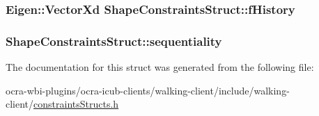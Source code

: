 \hypertarget{structShapeConstraintsStruct_a019f2dc8e024954a9413e0a5c5be9864}{
\subsubsection[{f\-History}]{\setlength{\rightskip}{0pt plus 5cm}\-Eigen\-::\-Vector\-Xd {\bf \-Shape\-Constraints\-Struct\-::f\-History}}}\label{structShapeConstraintsStruct_a019f2dc8e024954a9413e0a5c5be9864}
\hypertarget{structShapeConstraintsStruct_ab21948647937089aa8f72ddb8d1536b2}{
\subsubsection[{sequentiality}]{ {\bf \-Shape\-Constraints\-Struct\-::sequentiality}}}\label{structShapeConstraintsStruct_ab21948647937089aa8f72ddb8d1536b2}


\-The documentation for this struct was generated from the following file\-:\begin{DoxyCompactItemize}
\item 
ocra-\/wbi-\/plugins/ocra-\/icub-\/clients/walking-\/client/include/walking-\/client/\hyperlink{constraintsStructs_8h}{constraints\-Structs.\-h}\end{DoxyCompactItemize}
